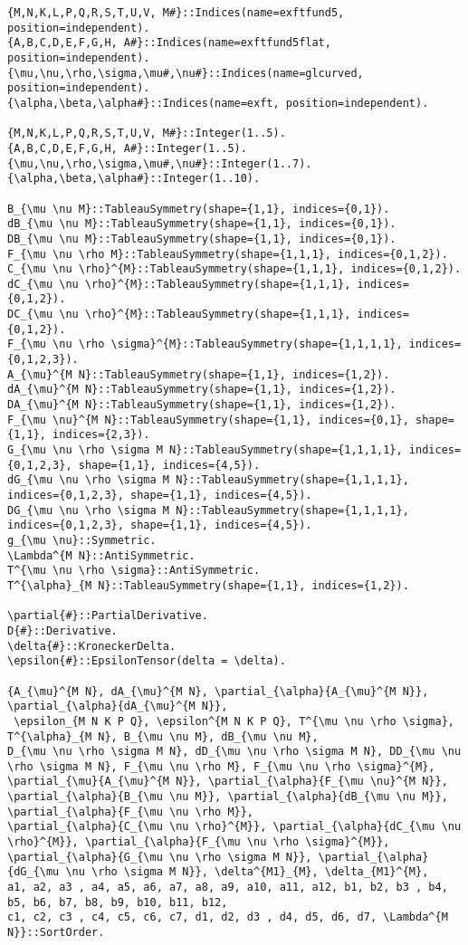 \documentclass[11pt]{article}
\begin{document}
{\color[named]{Blue}\begin{verbatim}
{M,N,K,L,P,Q,R,S,T,U,V, M#}::Indices(name=exftfund5, position=independent).
{A,B,C,D,E,F,G,H, A#}::Indices(name=exftfund5flat, position=independent).
{\mu,\nu,\rho,\sigma,\mu#,\nu#}::Indices(name=glcurved, position=independent).
{\alpha,\beta,\alpha#}::Indices(name=exft, position=independent).

{M,N,K,L,P,Q,R,S,T,U,V, M#}::Integer(1..5).
{A,B,C,D,E,F,G,H, A#}::Integer(1..5).
{\mu,\nu,\rho,\sigma,\mu#,\nu#}::Integer(1..7).
{\alpha,\beta,\alpha#}::Integer(1..10).

B_{\mu \nu M}::TableauSymmetry(shape={1,1}, indices={0,1}).
dB_{\mu \nu M}::TableauSymmetry(shape={1,1}, indices={0,1}).
DB_{\mu \nu M}::TableauSymmetry(shape={1,1}, indices={0,1}).
F_{\mu \nu \rho M}::TableauSymmetry(shape={1,1,1}, indices={0,1,2}).
C_{\mu \nu \rho}^{M}::TableauSymmetry(shape={1,1,1}, indices={0,1,2}).
dC_{\mu \nu \rho}^{M}::TableauSymmetry(shape={1,1,1}, indices={0,1,2}).
DC_{\mu \nu \rho}^{M}::TableauSymmetry(shape={1,1,1}, indices={0,1,2}).
F_{\mu \nu \rho \sigma}^{M}::TableauSymmetry(shape={1,1,1,1}, indices={0,1,2,3}).
A_{\mu}^{M N}::TableauSymmetry(shape={1,1}, indices={1,2}).
dA_{\mu}^{M N}::TableauSymmetry(shape={1,1}, indices={1,2}).
DA_{\mu}^{M N}::TableauSymmetry(shape={1,1}, indices={1,2}).
F_{\mu \nu}^{M N}::TableauSymmetry(shape={1,1}, indices={0,1}, shape={1,1}, indices={2,3}).
G_{\mu \nu \rho \sigma M N}::TableauSymmetry(shape={1,1,1,1}, indices={0,1,2,3}, shape={1,1}, indices={4,5}).
dG_{\mu \nu \rho \sigma M N}::TableauSymmetry(shape={1,1,1,1}, indices={0,1,2,3}, shape={1,1}, indices={4,5}).
DG_{\mu \nu \rho \sigma M N}::TableauSymmetry(shape={1,1,1,1}, indices={0,1,2,3}, shape={1,1}, indices={4,5}).
g_{\mu \nu}::Symmetric.
\Lambda^{M N}::AntiSymmetric.
T^{\mu \nu \rho \sigma}::AntiSymmetric.
T^{\alpha}_{M N}::TableauSymmetry(shape={1,1}, indices={1,2}).

\partial{#}::PartialDerivative.
D{#}::Derivative.
\delta{#}::KroneckerDelta.
\epsilon{#}::EpsilonTensor(delta = \delta).

{A_{\mu}^{M N}, dA_{\mu}^{M N}, \partial_{\alpha}{A_{\mu}^{M N}}, \partial_{\alpha}{dA_{\mu}^{M N}},
 \epsilon_{M N K P Q}, \epsilon^{M N K P Q}, T^{\mu \nu \rho \sigma}, T^{\alpha}_{M N}, B_{\mu \nu M}, dB_{\mu \nu M}, 
D_{\mu \nu \rho \sigma M N}, dD_{\mu \nu \rho \sigma M N}, DD_{\mu \nu \rho \sigma M N}, F_{\mu \nu \rho M}, F_{\mu \nu \rho \sigma}^{M},
\partial_{\mu}{A_{\mu}^{M N}}, \partial_{\alpha}{F_{\mu \nu}^{M N}},
\partial_{\alpha}{B_{\mu \nu M}}, \partial_{\alpha}{dB_{\mu \nu M}}, \partial_{\alpha}{F_{\mu \nu \rho M}}, 
\partial_{\alpha}{C_{\mu \nu \rho}^{M}}, \partial_{\alpha}{dC_{\mu \nu \rho}^{M}}, \partial_{\alpha}{F_{\mu \nu \rho \sigma}^{M}},
\partial_{\alpha}{G_{\mu \nu \rho \sigma M N}}, \partial_{\alpha}{dG_{\mu \nu \rho \sigma M N}}, \delta^{M1}_{M}, \delta_{M1}^{M},
a1, a2, a3 , a4, a5, a6, a7, a8, a9, a10, a11, a12, b1, b2, b3 , b4, b5, b6, b7, b8, b9, b10, b11, b12,
c1, c2, c3 , c4, c5, c6, c7, d1, d2, d3 , d4, d5, d6, d7, \Lambda^{M N}}::SortOrder.


\end{verbatim}}
\end{document}
